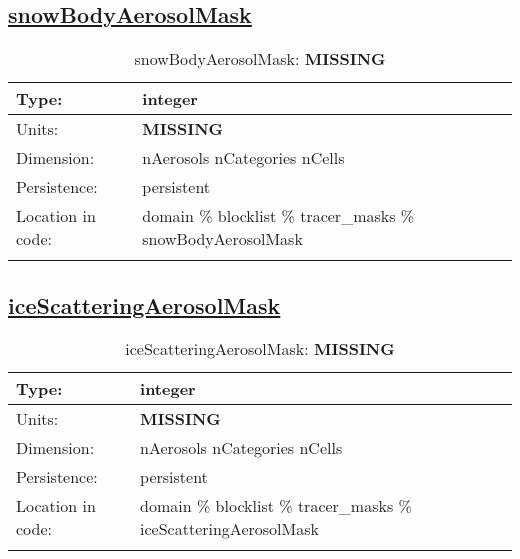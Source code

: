 \subsection[snowBodyAerosolMask]{\hyperref[sec:var_tab_tracer_masks]{snowBodyAerosolMask}}
\label{subsec:var_sec_tracer_masks_snowBodyAerosolMask}
\begin{center}
\begin{longtable}{| p{2.0in} | p{4.0in} |}
        \hline 
        Type: & integer \\
        \hline 
        Units: & {\bf \color{red} MISSING} \\
        \hline 
        Dimension: & nAerosols nCategories nCells \\
        \hline 
        Persistence: & persistent \\
        \hline 
         Location in code: & domain \% blocklist \% tracer\_masks \% snowBodyAerosolMask \\
         \hline 
    \caption{snowBodyAerosolMask: {\bf \color{red} MISSING}}
\end{longtable}
\end{center}
\subsection[iceScatteringAerosolMask]{\hyperref[sec:var_tab_tracer_masks]{iceScatteringAerosolMask}}
\label{subsec:var_sec_tracer_masks_iceScatteringAerosolMask}
\begin{center}
\begin{longtable}{| p{2.0in} | p{4.0in} |}
        \hline 
        Type: & integer \\
        \hline 
        Units: & {\bf \color{red} MISSING} \\
        \hline 
        Dimension: & nAerosols nCategories nCells \\
        \hline 
        Persistence: & persistent \\
        \hline 
         Location in code: & domain \% blocklist \% tracer\_masks \% iceScatteringAerosolMask \\
         \hline 
    \caption{iceScatteringAerosolMask: {\bf \color{red} MISSING}}
\end{longtable}
\end{center}
